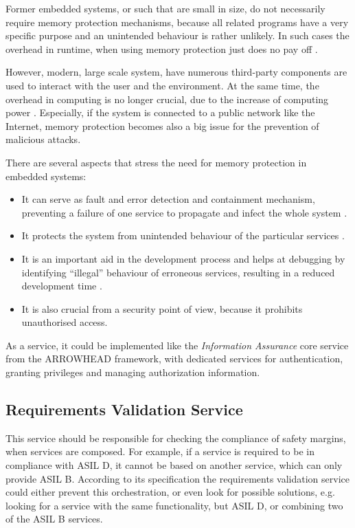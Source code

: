 Former embedded systems, or such that are small in size, do not necessarily require memory protection mechanisms, because all related programs have a very specific purpose and an unintended behaviour is rather unlikely. In such cases the overhead in runtime, when using memory protection just does no pay off \cite{yamada2008}. 

However, modern, large scale system, have numerous third-party components are used to interact with the user and the environment. At the same time, the overhead in computing is no longer crucial, due to the increase of computing power  \cite{yamada2008}. Especially, if the system is connected to a public network like the Internet, memory protection becomes also a big issue for the prevention of malicious attacks.

There are several aspects that stress the need for memory protection in embedded systems:
\begin{itemize}
\item It can serve as fault and error detection and containment mechanism, preventing a failure of one service to propagate and infect the whole system \cite{yamada2008}.
\item It protects the system from unintended behaviour of the particular services \cite{yamada2014}.
\item It is an important aid in the development process and helps at debugging by identifying ``illegal'' behaviour of erroneous services, resulting in a reduced development time \cite{yamada2008} \cite{yamada2014}.
\item It is also crucial from a security point of view, because it prohibits unauthorised access.
\end{itemize}

As a service, it could be implemented like the \emph{Information Assurance} core service from the ARROWHEAD framework, with dedicated services for authentication, granting privileges and managing authorization information.


\subsection{Requirements Validation Service}

This service should be responsible for checking the compliance of safety margins, when services are composed. For example, if a service is required to be in compliance with ASIL D, it cannot be based on another service, which can only provide ASIL B. 
According to its specification the requirements validation service could either prevent this orchestration, or even look for possible solutions, e.g. looking for a service with the same functionality, but ASIL D, or combining two of the ASIL B services.

